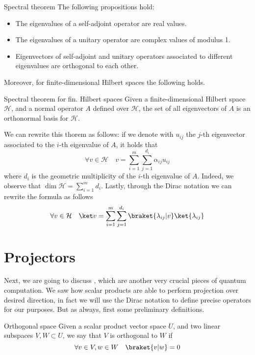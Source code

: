 \documentclass[a4paper, 12pt]{report}
\begin{document}
\begin{framedthm}{Spectral theorem}
	The following propositions hold:

	\begin{itemize}
		\item The eigenvalues of a self-adjoint operator are real values.
		\item The eigenvalues of a unitary operator are complex values of modulus 1.
		\item Eigenvectors of self-adjoint and unitary operators associated to different eigenvalues are orthogonal to each other.
	\end{itemize}
\end{framedthm}

Moreover, for finite-dimensional Hilbert spaces the following holds.

\begin{framedthm}{Spectral theorem for fin. Hilbert spaces}
    Given a finite-dimensional Hilbert space $\mathcal H$, and a normal operator $A$ defined over $\mathcal H$, the set of all eigenvectors of $A$ is an orthonormal basis for $\mathcal H$.
\end{framedthm}

We can rewrite this thorem as follows: if we denote with $u_{ij}$ the $j$-th eigenvector associated to the $i$-th eigenvalue of $A$, it holds that $$\forall v \in \mathcal H \quad v = \sum_{i = 1}^m{\sum_{j = 1}^{d_i}{\alpha_{ij} u_{ij}}}$$ where $d_i$ is the geometric multiplicity of the $i$-th eigenvalue of $A$. Indeed, we observe that $\dim \mathcal H = \sum_{i = 1}^m{d_i}$. Lastly, through the Dirac notation we can rewrite the formula as follows $$\forall v \in \mathcal H \quad \ket v = \sum_{i = 1}^m{\sum_{j = 1}^{d_i}{\braket{\lambda_{ij}|v} \ket{\lambda_{ij}}}}$$

\section{Projectors}

Next, we are going to discuss , which are another very crucial pieces of quantum computation. We saw how scalar products are able to perform projection over desired direction, in fact we will use the Dirac notation to define precise operators for our purposes. But as always, first some preliminary definitions.

\begin{frameddefn}{Orthogonal space}
    Given a scalar product vector space $U$, and two linear subspaces $V, W \subset U$, we say that $V$ is orthogonal to $W$ if $$\forall v \in V, w \in W \quad \braket{v|w} = 0$$
\end{frameddefn}
\end{document}
